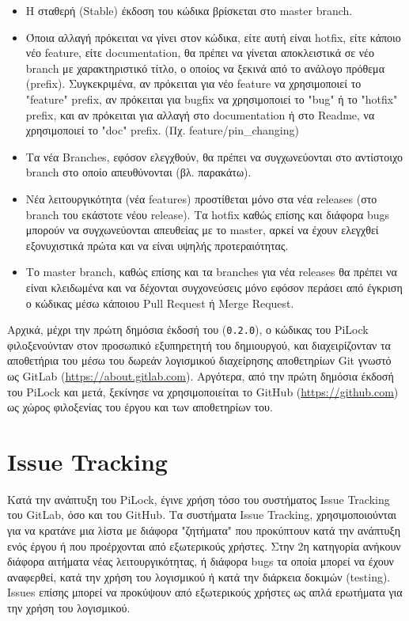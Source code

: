 	\begin{itemize}
		\item Η σταθερή (Stable) έκδοση του κώδικα βρίσκεται στο master branch.
		\item Όποια αλλαγή πρόκειται να γίνει στον κώδικα, είτε αυτή είναι hotfix, είτε κάποιο νέο feature, είτε documentation, θα πρέπει να γίνεται αποκλειστικά σε νέο branch με χαρακτηριστικό τίτλο, ο οποίος να ξεκινά από το ανάλογο πρόθεμα (prefix). Συγκεκριμένα, αν πρόκειται για νέο feature να χρησιμοποιεί το "feature" prefix, αν πρόκειται για bugfix να χρησιμοποιεί το "bug" ή το "hotfix" prefix, και αν πρόκειται για αλλαγή στο documentation ή στο Readme, να χρησιμοποιεί το "doc" prefix. (Πχ. feature/pin\_changing)
		\item Τα νέα Branches, εφόσον ελεγχθούν, θα πρέπει να συγχωνεύονται στο αντίστοιχο branch στο οποίο απευθύνονται (βλ. παρακάτω).
		\item Νέα λειτουργικότητα (νέα features) προστίθεται μόνο στα νέα releases (στο branch του εκάστοτε νέου release). Τα hotfix καθώς επίσης και διάφορα bugs μπορούν να συγχωνεύονται απευθείας με το master, αρκεί να έχουν ελεγχθεί εξονυχιστικά πρώτα και να είναι υψηλής προτεραιότητας.
		\item Το master branch, καθώς επίσης και τα branches για νέα releases θα πρέπει να είναι κλειδωμένα και να δέχονται συγχονεύσεις μόνο εφόσον περάσει από έγκριση ο κώδικας μέσω κάποιου Pull Request ή Merge Request.
	\end{itemize} 

	Αρχικά, μέχρι την πρώτη δημόσια έκδοσή του (\verb|0.2.0|), ο κώδικας του PiLock φιλοξενούνταν στον προσωπικό εξυπηρετητή του δημιουργού, και διαχειρίζονταν τα αποθετήρια του μέσω του δωρεάν λογισμικού διαχείρησης αποθετηρίων Git γνωστό ως GitLab (\url{https://about.gitlab.com}). Αργότερα, από την πρώτη δημόσια έκδοσή του PiLock και μετά, ξεκίνησε να χρησιμοποιείται το GitHub (\url{https://github.com}) ως χώρος φιλοξενίας του έργου και των αποθετηρίων του.

\section{Issue Tracking}
	Κατά την ανάπτυξη του PiLock, έγινε χρήση τόσο του συστήματος Issue Tracking του GitLab, όσο και του GitHub. Τα συστήματα Issue Tracking, χρησιμοποιούνται για να κρατάνε μια λίστα με διάφορα "ζητήματα" που προκύπτουν κατά την ανάπτυξη ενός έργου ή που προέρχονται από εξωτερικούς χρήστες. Στην 2η κατηγορία ανήκουν διάφορα αιτήματα νέας λειτουργικότητας, ή διάφορα bugs τα οποία μπορεί να έχουν αναφερθεί, κατά την χρήση του λογισμικού ή κατά την διάρκεια δοκιμών (testing). Issues επίσης μπορεί να προκύψουν από εξωτερικούς χρήστες ως απλά ερωτήματα για την χρήση του λογισμικού.

